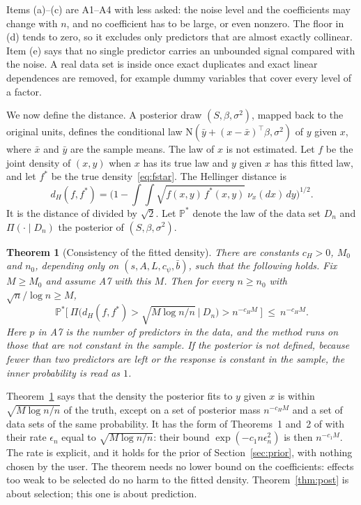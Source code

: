 \documentclass[11pt]{article}
\renewcommand{\P}{\mathbb{P}}
\newcommand{\N}{\mathrm{N}}
\newcommand{\Dn}{D_n}
\theoremstyle{plain}
\newtheorem{thm}{Theorem}
\theoremstyle{definition}
\begin{document}
Items (a)--(c) are A1--A4 with less asked: the noise level and the coefficients may change with $n$, and no coefficient
has to be large, or even nonzero. The floor in (d) tends to zero, so it excludes only predictors that are almost exactly
collinear. Item (e) says that no single predictor carries an unbounded signal compared with the noise. A real data set
is inside once exact duplicates and exact linear dependences are removed, for example dummy variables that cover every
level of a factor.

We now define the distance. A posterior draw $(S,\beta,\sigma^2)$, mapped back to the original units, defines the
conditional law $\N(\bar y+(x-\bar x)^\top\beta,\sigma^2)$ of $y$ given $x$, where $\bar x$ and $\bar y$ are the sample
means. The law of $x$ is not estimated. Let $f$ be the joint density of $(x,y)$ when $x$ has its true law and $y$ given
$x$ has this fitted law, and let $f^*$ be the true density~\eqref{eq:fstar}. The Hellinger distance is
\[
  d_H(f,f^*)=\Big(1-\int\!\!\int\sqrt{f(x,y)\,f^*(x,y)}\ \nu_x(dx)\,dy\Big)^{1/2}.
\]
It is the distance of \citet{SongLiang2015} divided by $\sqrt2$. Let $\P^*$ denote the law of the data set $\Dn$ and
$\Pi(\cdot\mid\Dn)$ the posterior of $(S,\beta,\sigma^2)$.

\begin{thm}[Consistency of the fitted density]\label{thm:dist}
There are constants $c_H>0$, $M_0$ and $n_0$, depending only on $(s,A,L,c_\psi,\bar b)$, such that the following holds.
Fix $M\ge M_0$ and assume A7 with this $M$. Then for every $n\ge n_0$ with $\sqrt n/\log n\ge M$,
\[
  \P^*\Big[\ \Pi\Big(d_H(f,f^*)>\sqrt{M\log n/n}\ \Big|\ \Dn\Big)>n^{-c_HM}\ \Big]\ \le\ n^{-c_HM}.
\]
Here $p$ in A7 is the number of predictors in the data, and the method runs on those that are not constant in the
sample. If the posterior is not defined, because fewer than two predictors are left or the response is constant in the
sample, the inner probability is read as $1$.
\end{thm}

Theorem~\ref{thm:dist} says that the density the posterior fits to $y$ given $x$ is within $\sqrt{M\log n/n}$ of the
truth, except on a set of posterior mass $n^{-c_HM}$ and a set of data sets of the same probability. It has the form
of Theorems~1 and~2 of \citet{SongLiang2015} with their rate $\epsilon_n$ equal to $\sqrt{M\log n/n}$: their bound
$\exp(-c_1n\epsilon_n^2)$ is then $n^{-c_1M}$. The rate is explicit, and it holds for the prior of
Section~\ref{sec:prior}, with nothing chosen by the user. The theorem needs no lower bound on the coefficients: effects
too weak to be selected do no harm to the fitted density. Theorem~\ref{thm:post} is about selection; this one is about
prediction.
\end{document}
